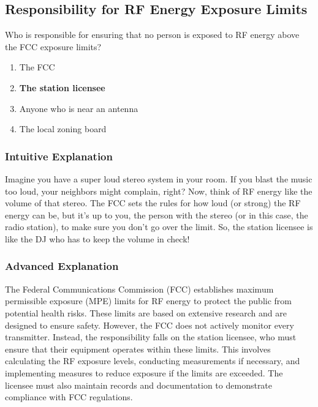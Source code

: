 \subsection{Responsibility for RF Energy Exposure Limits}
\label{T0C13}

\begin{tcolorbox}[colback=gray!10!white,colframe=black!75!black,title=T0C13]
Who is responsible for ensuring that no person is exposed to RF energy above the FCC exposure limits?
\begin{enumerate}[label=\Alph*]
    \item The FCC
    \item \textbf{The station licensee}
    \item Anyone who is near an antenna
    \item The local zoning board
\end{enumerate}
\end{tcolorbox}

\subsubsection{Intuitive Explanation}
Imagine you have a super loud stereo system in your room. If you blast the music too loud, your neighbors might complain, right? Now, think of RF energy like the volume of that stereo. The FCC sets the rules for how loud (or strong) the RF energy can be, but it's up to you, the person with the stereo (or in this case, the radio station), to make sure you don't go over the limit. So, the station licensee is like the DJ who has to keep the volume in check!

\subsubsection{Advanced Explanation}
The Federal Communications Commission (FCC) establishes maximum permissible exposure (MPE) limits for RF energy to protect the public from potential health risks. These limits are based on extensive research and are designed to ensure safety. However, the FCC does not actively monitor every transmitter. Instead, the responsibility falls on the station licensee, who must ensure that their equipment operates within these limits. This involves calculating the RF exposure levels, conducting measurements if necessary, and implementing measures to reduce exposure if the limits are exceeded. The licensee must also maintain records and documentation to demonstrate compliance with FCC regulations.

